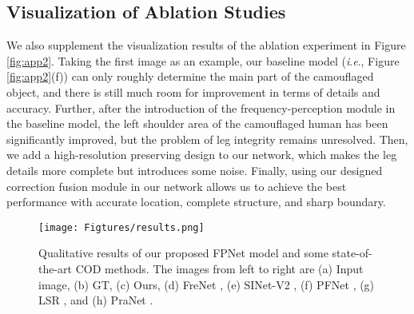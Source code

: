 \documentclass[sigconf,screen]{acmart}
\newcommand{\ie}{\textit{i}.\textit{e}.}
\begin{document}
\subsection {Visualization of Ablation Studies}
We also supplement the visualization results of the ablation experiment in Figure \ref{fig:app2}. 
Taking the first image as an example, our baseline model (\ie, Figure \ref{fig:app2}(f)) can only roughly determine the main part of the camouflaged object, and there is still much room for improvement in terms of details and accuracy.
Further, after the introduction of the frequency-perception module in the baseline model, the left shoulder area of the camouflaged human has been significantly improved, but the problem of leg integrity remains unresolved.
Then, we add a high-resolution preserving design to our network, which makes the leg details more complete but introduces some noise.
Finally, using our designed correction fusion module in our network allows us to achieve the best performance with accurate location, complete structure, and sharp boundary.



\begin{figure*}[!t]
\centering
\texttt{[image: Figtures/results.png]}
\caption{Qualitative results of our proposed FPNet model and some state-of-the-art COD methods. The images from left to right are (a) Input image, (b) GT, (c) Ours, (d) FreNet \cite{r39}, (e) SINet-V2 \cite{r53}, (f) PFNet \cite{r15}, (g) LSR \cite{r38}, and (h) PraNet \cite{r24}.}
\label{fig:app1}
\end{figure*}
\end{document}
